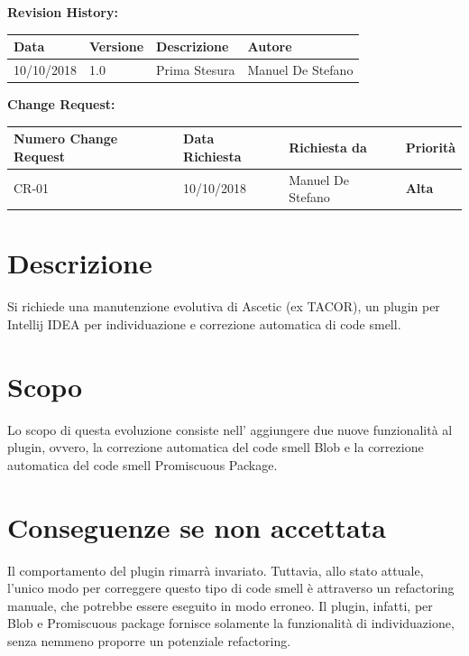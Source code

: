 	\textbf{Revision History:}
	\begin{table}[h]
		\centering
		\begin{tabularx}{0.9\textwidth}{|p{2cm}|l|X|p{3cm}|}
			\hline
			\textbf{Data} & \textbf{Versione} & \textbf{Descrizione} & \textbf{Autore} \\ \hline
			10/10/2018 & 1.0  & Prima Stesura & Manuel De Stefano \\ \hline
		\end{tabularx}
	\end{table}


	\textbf{Change Request:}
	\begin{table}[h!]
		\centering
		\begin{tabularx}{0.9\textwidth}{|p{3cm}|p{2cm}|X|l|}
			\hline
			\textbf{Numero Change Request} & \textbf{Data Richiesta} & \textbf{Richiesta da} & \textbf{Priorità} \\ \hline
			CR-01 & 10/10/2018 & Manuel De Stefano & \textbf{Alta} \\ \hline
		\end{tabularx}
	\end{table}


	
	\section{Descrizione}
		Si richiede una manutenzione evolutiva di Ascetic (ex TACOR), un plugin per Intellij IDEA per individuazione e correzione
		automatica di code smell.

	\section{Scopo}
		Lo scopo di questa evoluzione consiste nell' aggiungere due nuove funzionalità al plugin, ovvero, la correzione automatica del code smell Blob e la correzione automatica del code smell Promiscuous Package.		
	
	\section{Conseguenze se non accettata}
		Il comportamento del plugin rimarrà invariato. Tuttavia, allo stato attuale, l'unico modo per correggere questo tipo di code smell è attraverso un refactoring manuale, che potrebbe essere eseguito in modo erroneo. Il plugin, infatti, per Blob e Promiscuous package fornisce solamente la funzionalità di individuazione, senza nemmeno proporre un potenziale refactoring.
	

